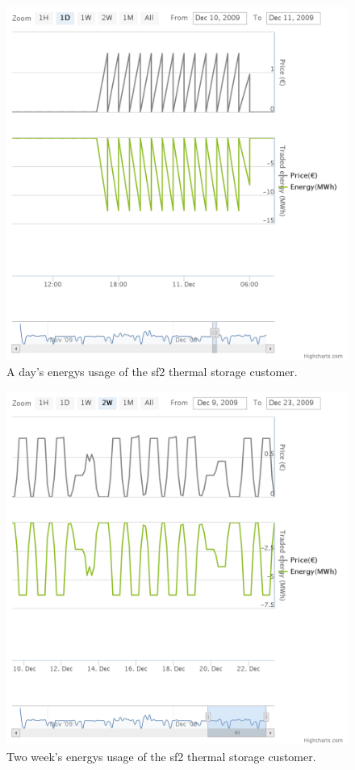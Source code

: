 \begin{figure}[h!]
  \includegraphics[width=\linewidth]{sf2-thermal-daily.png}
  \caption{A day's energys usage of the sf2 thermal storage customer.}
  \label{fig:day-thermal}
\end{figure}

\begin{figure}[h!]
  \includegraphics[width=\linewidth]{sf2-thermal-week.png}
  \caption{Two week's energys usage of the sf2 thermal storage customer.}
  \label{fig:thermal-week}
\end{figure}


